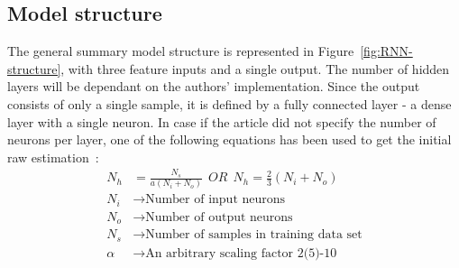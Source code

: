 \subsection{Model structure} \label{subsec:structure}
The general summary model structure is represented in Figure~\ref{fig:RNN-structure}, with three feature inputs and a single output.
The number of hidden layers will be dependant on the authors' implementation.
Since the output consists of only a single sample, it is defined by a fully connected layer - a dense layer with a single neuron.
In case if the article did not specify the number of neurons per layer, one of the following equations has been used to get the initial raw estimation~\cite{eckhardt_choosing_2018}:
\begin{equation}
    \begin{split}
        N_h &= \frac{N_s}{ a \left(N_i+N_o \right)} \ \ OR \ \ N_h = \frac{2}{3}\left(N_i+N_o \right) \\
        N_i &\rightarrow \text{Number of input neurons} \\
        N_o &\rightarrow \text{Number of output neurons} \\
        N_s &\rightarrow \text{Number of samples in training data set} \\
        \alpha &\rightarrow \text{An arbitrary scaling factor 2(5)-10}
    \end{split}
\end{equation}


